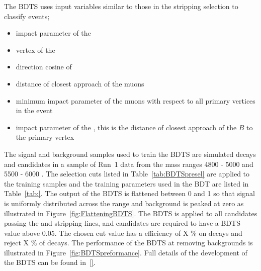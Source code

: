 The BDTS uses input variables similar to those in the stripping selection to classify events;
\begin{itemize}
\item impact parameter \chisqd of the \bs
\item vertex \chisqd of the \bs
\item direction cosine of \bs
\item distance of closest approach of the muons
\item minimum impact parameter \chisqd of the muons with respect to all primary vertices in the event
\item impact parameter of the \bs, this is the distance of closest approach of the $B$ to the primary vertex
\end{itemize}
The signal and background samples used to train the BDTS are simulated \bsmumu decays and \bsmumu candidates in a sample of Run~1 data from the mass ranges 4800 - 5000 \mevcc and 5500 - 6000 \mevcc. The selection cuts listed in Table~\ref{tab:BDTSpresel} are applied to the training samples and the training parameters used in the BDT are listed in Table~\ref{tab:}. The output of the BDTS is flattened between 0 and 1 so that signal is uniformly distributed across the range and background is peaked at zero as illustrated in Figure~\ref{fig:FlatteningBDTS}. The BDTS is applied to all candidates passing the \bmumu and \bhh stripping lines, and candidates are required to have a BDTS value above 0.05. The chosen cut value has a efficiency of X $\%$ on \bsmumu decays and reject X $\%$ of \bbbarmumux decays. The performance of the BDTS at removing backgrounds is illustrated in Figure~\ref{fig:BDTSpreformance}. Full details of the development of the BDTS can be found in~\ref{}.

